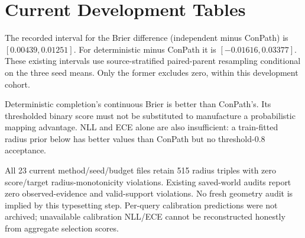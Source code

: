\documentclass[conference,letterpaper,10pt,onecolumn]{IEEEtran}
\begin{document}
\section{Current Development Tables}
\begin{table}[H]\centering\small
\caption{D1 compact six-method matrix (source table T1). Three seeds, equal-parent weighting. Hidden-map Brier here is the hard-world free-frequency score; deterministic $K=1$ is binary-map squared error, not its continuous probability score. Risk30 means risk at equal 30\% coverage. Missing measurements are not zero.}

\end{table}
The recorded interval for the Brier difference (independent minus ConPath) is $[0.00439,0.01251]$. For deterministic minus ConPath it is $[-0.01616,0.03377]$. These existing intervals use source-stratified paired-parent resampling conditional on the three seed means. Only the former excludes zero, within this development cohort.

\begin{table}[H]\centering\small
\caption{D1 retrospective metrics (T1b), from unchanged saved predictions. NLL clips at $10^{-6}$; ECE uses ten equal-width bins. These additional summaries were not original model-selection criteria. Continuous hidden-map Brier uses deterministic sigmoid probabilities and the stochastic $K=32$ conditional-probability average.}

\end{table}
Deterministic completion's continuous Brier is better than ConPath's. Its thresholded binary score must not be substituted to manufacture a probabilistic mapping advantage. NLL and ECE alone are also insufficient: a train-fitted radius prior below has better values than ConPath but no threshold-0.8 acceptance.

\begin{table}[H]\centering\small
\caption{D1 saved $K=4$ prefix versus $K=32$ (T1c). Same checkpoints and queries; no new inference. Zero score-monotonicity violations are structural checks and are not calibration guarantees.}

\end{table}
All 23 current method/seed/budget files retain 515 radius triples with zero score/target radius-monotonicity violations. Existing saved-world audits report zero observed-evidence and valid-support violations. No fresh geometry audit is implied by this typesetting step. Per-query calibration predictions were not archived; unavailable calibration NLL/ECE cannot be reconstructed honestly from aggregate selection scores.
\end{document}

